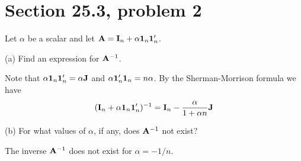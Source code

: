 \section{Section 25.3, problem 2}
Let $\alpha$ be a scalar and let ${\bf A}={\bf I}_n+\alpha{\bf 1}_n{\bf 1}'_n$.

\bigskip
\noindent
(a) Find an expression for ${\bf A}^{-1}$.

\bigskip
\noindent
Note that $\alpha{\bf 1}_n{\bf 1}'_n=\alpha{\bf J}$ and $\alpha{\bf 1}'_n{\bf 1}_n=n\alpha$.
By the Sherman-Morrison formula we have
$$({\bf I}_n+\alpha{\bf 1}_n{\bf 1}'_n)^{-1}
={\bf I}_n-{\alpha\over1+\alpha n}{\bf J}
$$

\bigskip
\noindent
(b) For what values of $\alpha$, if any, does ${\bf A}^{-1}$ not exist?

\bigskip
\noindent
The inverse ${\bf A}^{-1}$ does not exist for $\alpha=-1/n$.

